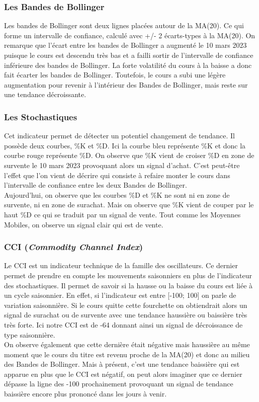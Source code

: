 \documentclass[12pt,a4paper]{article}
\begin{document}
\subsubsection*{Les Bandes de Bollinger}
Les bandes de Bollinger sont deux lignes placées autour de la MA(20). Ce qui forme un intervalle de confiance, calculé avec +/- 2 écarts-types à la MA(20).
On remarque que l'écart entre les bandes de Bollinger a augmenté le 10 mars 2023 puisque le cours est descendu très bas et a failli sortir de l'intervalle de confiance 
inférieure des bandes de Bollinger. La forte volatilité du cours à la baisse a donc fait écarter les bandes de Bollinger. Toutefois, le cours a subi une légère 
augmentation pour revenir à l'intérieur des Bandes de Bollinger, mais reste sur une tendance décroissante.
\subsubsection*{Les Stochastiques}
Cet indicateur permet de détecter un potentiel changement de tendance. Il possède deux courbes, \%K et \%D. Ici la courbe bleu représente \%K et donc la courbe rouge 
représente \%D. On observe que \%K vient de croiser \%D en zone de survente le 10 mars 2023 provoquant alors un signal d'achat. C'est peut-être l'effet que l'on vient de 
décrire qui consiste à refaire monter le cours dans l'intervalle de confiance entre les deux Bandes de Bollinger.\\
Aujourd'hui, on observe que les courbes \%D et \%K ne sont ni en zone de survente, ni en zone de surachat. Mais on observe que \%K vient de couper par le haut \%D ce qui 
se traduit par un signal de vente. Tout comme les Moyennes Mobiles, on observe un signal clair qui est de vente.
\subsubsection*{CCI (\textit{Commodity Channel Index})} 
Le CCI est un indicateur technique de la famille des oscillateurs. Ce dernier permet de prendre en compte les mouvements saisonniers en 
plus de l'indicateur des stochastiques. Il permet de savoir si la hausse ou la baisse du cours est liée à un cycle saisonnier. En effet, si l'indicateur est entre [-100;
100] on parle de variation saisonnière. Si le cours quitte cette fourchette on obtiendrait alors un signal de surachat ou de survente avec une tendance haussière ou 
baissière très très forte.
Ici notre CCI est de -64 donnant ainsi un signal de décroissance de type saisonnière.\\[11pt]
On observe également que cette dernière était négative mais haussière au même moment que le cours du titre est revenu proche de la MA(20) et donc au milieu des Bandes de 
Bollinger. Mais à présent, c'est une tendance baissière qui est apparue en plus que le CCI est négatif, on peut alors imaginer que ce dernier dépasse la ligne des -100 
prochainement provoquant un signal de tendance baissière encore plus prononcé dans les jours à venir.
\end{document}
